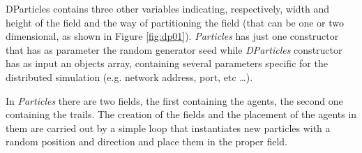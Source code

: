\documentclass[12pt]{article}
\begin{document}
DParticles contains three other variables indicating, respectively, width and height of the field and the way of partitioning the field (that can be one or two dimensional, as shown in Figure \ref{fig:dp01}). \textit{Particles} has just one constructor that has as parameter the random generator seed while \textit{DParticles} constructor has as input an objects array, containing several parameters specific for the distributed simulation (e.g. network address, port, etc \ldots). 

In \textit{Particles} there are two fields, the first containing the agents, the second one containing the trails. The creation of the fields and the placement of the agents in them are carried out by a simple loop that instantiates new particles with a random position and direction and place them in the proper field. 
\end{document}
